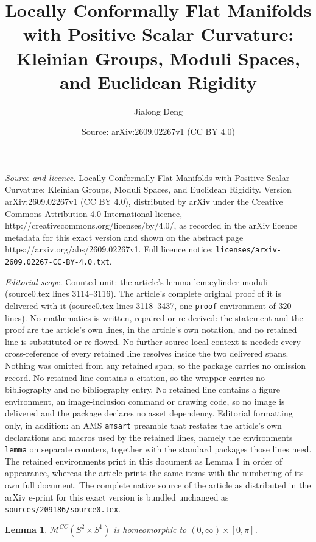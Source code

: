 \documentclass[10pt,a4paper]{amsart}
\title{Locally Conformally Flat Manifolds with Positive Scalar Curvature: Kleinian Groups, Moduli Spaces, and Euclidean Rigidity}
\author{Jialong Deng}
\date{Source: arXiv:2609.02267v1 (CC BY 4.0)}
\newtheorem{lemma}{Lemma}
\begin{document}
\maketitle

\noindent\emph{Source and licence.} Locally Conformally Flat Manifolds with Positive Scalar Curvature: Kleinian Groups, Moduli Spaces, and Euclidean Rigidity. Version arXiv:2609.02267v1 (CC BY 4.0), distributed by arXiv under the Creative Commons Attribution 4.0 International licence, http://creativecommons.org/licenses/by/4.0/, as recorded in the arXiv licence metadata for this exact version and shown on the abstract page https://arxiv.org/abs/2609.02267v1. Full licence notice: \texttt{licenses/arxiv-2609.02267-CC-BY-4.0.txt}.\par\smallskip

\noindent\textit{Editorial scope.} Counted unit: the article's lemma lem:cylinder-moduli (source0.tex lines 3114--3116). The article's complete original proof of it is delivered with it (source0.tex lines 3118--3437, one \texttt{proof} environment of 320 lines). No mathematics is written, repaired or re-derived: the statement and the proof are the article's own lines, in the article's own notation, and no retained line is substituted or re-flowed.  No further source-local context is needed: every cross-reference of every retained line resolves inside the two delivered spans.  Nothing was omitted from any retained span, so the package carries no omission record.  No retained line contains a citation, so the wrapper carries no bibliography and no bibliography entry.  No retained line contains a figure environment, an image-inclusion command or drawing code, so no image is delivered and the package declares no asset dependency.  Editorial formatting only, in addition: an AMS \texttt{amsart} preamble that restates the article's own declarations and macros used by the retained lines, namely the environments \texttt{lemma} on separate counters, together with the standard packages those lines need.  The retained environments print in this document as Lemma 1 in order of appearance, whereas the article prints the same items with the numbering of its own full document.  The complete native source of the article as distributed in the arXiv e-print for this exact version is bundled unchanged as \texttt{sources/209186/source0.tex}.
\begin{lemma}\label{lem:cylinder-moduli}
\(\mathcal{M}^{CC}(S^2 \times S^1)\) is homeomorphic to \((0,\infty) \times [0,\pi]\).
\end{lemma}
\end{document}
